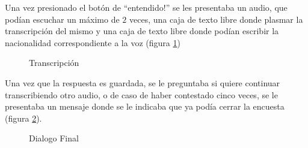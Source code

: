 Una vez presionado el botón de ``entendido!'' se les presentaba un audio, que podían escuchar un máximo de $2$ veces, una caja de texto libre donde plasmar la transcripción del mismo y una caja de texto libre donde podían escribir la nacionalidad correspondiente a la voz (figura \ref{transcripcion})

\begin{figure}
\begin{center}
\end{center}
\caption{Transcripción}
\label{transcripcion}
\end{figure}

Una vez que la respuesta es guardada, se le preguntaba si quiere continuar transcribiendo otro audio, o de caso de haber contestado cinco veces, se le presentaba un mensaje donde se le indicaba que ya podía cerrar la encuesta (figura \ref{continuar}).

\begin{figure}
\begin{center}
\end{center}
\caption{Dialogo Final}
\label{continuar}
\end{figure}